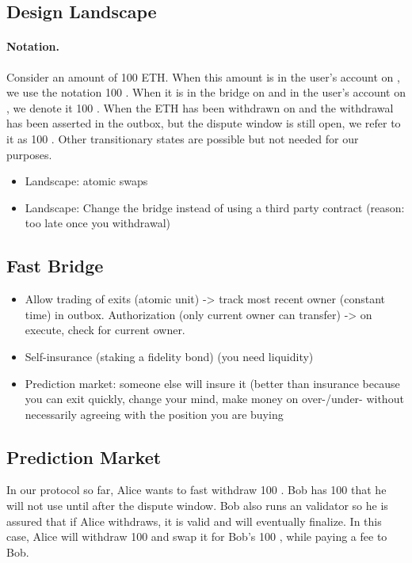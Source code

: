 \subsection{Design Landscape}

\paragraph{Notation.} Consider an amount of 100 ETH. When this amount is in the user's account on \layerone, we use the notation 100 \ethone. When it is in the bridge on \layerone and in the user's account on \layertwo, we denote it 100 \ethtwo. When the ETH has been withdrawn on \layertwo and the withdrawal has been asserted in the \layerone outbox, but the dispute window is still open, we refer to it as 100 \ethxx. Other transitionary states are possible but not needed for our purposes.

\begin{itemize}
\item Landscape: atomic swaps
\item Landscape: Change the bridge instead of using a third party contract (reason: too late once you withdrawal)
\end{itemize}

\subsection{Fast Bridge} 

\begin{itemize}
\item Allow trading of exits (atomic unit) -> track most recent owner (constant time) in outbox. Authorization (only current owner can transfer) -> on execute, check for current owner. 
\item Self-insurance (staking a fidelity bond) (you need liquidity) 
\item Prediction market: someone else will insure it (better than insurance because you can exit quickly, change your mind, make money on over-/under- without necessarily agreeing with the position you are buying
\end{itemize}

\subsection{Prediction Market}

In our protocol so far, Alice wants to fast withdraw 100 \ethtwo. Bob has 100 \ethone that he will not use until after the dispute window. Bob also runs an \layertwo validator so he is assured that if Alice withdraws, it is valid and will eventually finalize. In this case, Alice will withdraw 100 \ethxx and swap it for Bob's 100 \ethone, while paying a fee to Bob. 

